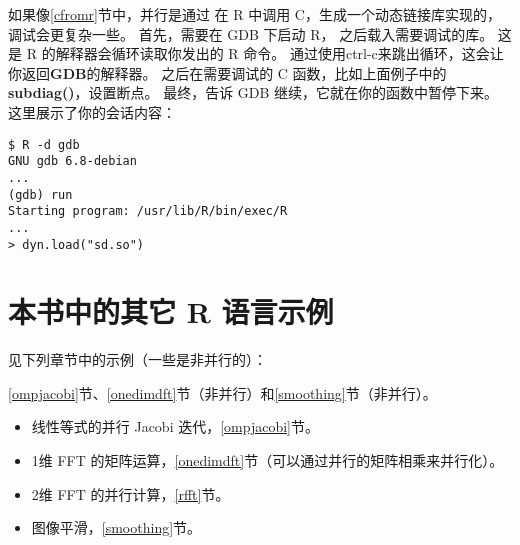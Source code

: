 如果像\ref{cfromr}节中，并行是通过
在 R 中调用 C，生成一个动态链接库实现的，
调试会更复杂一些。
首先，需要在 GDB 下启动 R，
之后载入需要调试的库。
这是 R 的解释器会循环读取你发出的 R 命令。
通过使用ctrl-c来跳出循环，这会让你返回{\bf GDB}的解释器。
之后在需要调试的 C 函数，比如上面例子中的{\bf subdiag()}，设置断点。
最终，告诉 GDB 继续，它就在你的函数中暂停下来。
这里展示了你的会话内容：

\begin{lstlisting}
$ R -d gdb
GNU gdb 6.8-debian
...
(gdb) run
Starting program: /usr/lib/R/bin/exec/R
...
> dyn.load("sd.so")
\end{lstlisting}

\section{本书中的其它 R 语言示例}

见下列章节中的示例（一些是非并行的）：

\ref{ompjacobi}节、\ref{onedimdft}节（非并行）和\ref{smoothing}节（非并行）。

\begin{itemize}

\item 线性等式的并行 Jacobi 迭代，\ref{ompjacobi}节。

\item 1维 FFT 的矩阵运算，\ref{onedimdft}节（可以通过并行的矩阵相乘来并行化）。

\item 2维 FFT 的并行计算，\ref{rfft}节。

\item 图像平滑，\ref{smoothing}节。

\end{itemize}



